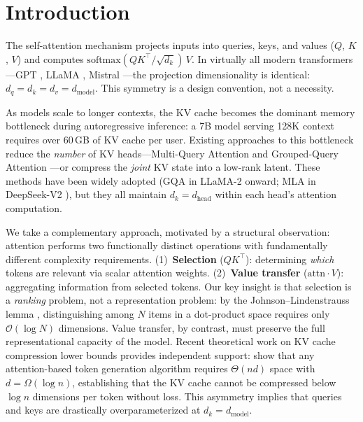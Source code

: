 \documentclass{article} %
\newcommand{\dmodel}{d_{\text{model}}}
\newcommand{\dhead}{d_{\text{head}}}
\newcommand{\softmax}{\text{softmax}}
\newcommand{\BigO}{\mathcal{O}}
\begin{document}
\section{Introduction}

The self-attention mechanism \citep{vaswani2017attention} projects inputs into queries, keys, and values ($Q$, $K$, $V$) and computes $\softmax(QK^\top\!/\!\sqrt{d_k})\,V$. In virtually all modern transformers---GPT \citep{radford2018improving}, LLaMA \citep{touvron2023llama}, Mistral \citep{jiang2023mistral}---the projection dimensionality is identical: $d_q = d_k = d_v = \dmodel$. This symmetry is a design convention, not a necessity.

As models scale to longer contexts, the KV cache becomes the dominant memory bottleneck during autoregressive inference: a 7B model serving 128K context requires over 60\,GB of KV cache per user. Existing approaches to this bottleneck reduce the \emph{number} of KV heads---Multi-Query Attention \citep{shazeer2019fast} and Grouped-Query Attention \citep{ainslie2023gqa}---or compress the \emph{joint} KV state into a low-rank latent. These methods have been widely adopted (GQA in LLaMA-2 \citep{touvron2023llama} onward; MLA in DeepSeek-V2 \citep{liu2024deepseek}), but they all maintain $d_k = \dhead$ within each head's attention computation.

We take a complementary approach, motivated by a structural observation: attention performs two functionally distinct operations with fundamentally different complexity requirements. (1)~\textbf{Selection} ($QK^\top$): determining \emph{which} tokens are relevant via scalar attention weights. (2)~\textbf{Value transfer} ($\text{attn} \cdot V$): aggregating information from selected tokens. Our key insight is that selection is a \emph{ranking} problem, not a representation problem: by the Johnson--Lindenstrauss lemma \citep{johnson1984extensions}, distinguishing among $N$ items in a dot-product space requires only $\BigO(\log N)$ dimensions. Value transfer, by contrast, must preserve the full representational capacity of the model. Recent theoretical work on KV cache compression lower bounds provides independent support: \citet{compressionbarriers2025} show that any attention-based token generation algorithm requires $\Theta(nd)$ space with $d = \Omega(\log n)$, establishing that the KV cache cannot be compressed below $\log n$ dimensions per token without loss. This asymmetry implies that queries and keys are drastically overparameterized at $d_k = \dmodel$.
\end{document}
